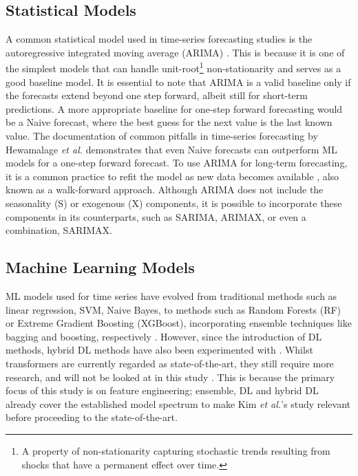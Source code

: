 \documentclass[ %
                    author={Raj Dhakan},
                supervisor={Dr. Ayush Joshi},
                    degree={MSc},
                     title={Ethereum Price Prediction using Internal and External Factors},
                  subtitle={},
                      type={},
                      year={2025}]{dissertation}
\begin{document}
\subsection{Statistical Models}
\label{sec:statistical_models}
A common statistical model used in time-series forecasting studies is the autoregressive integrated moving average (ARIMA) \cite{sailaja2024crypto}. This is because it is one of the simplest models that can handle unit-root\footnote{A property of non-stationarity capturing stochastic trends resulting from shocks that have a permanent effect over time.} non-stationarity and serves as a good baseline model. It is essential to note that ARIMA is a valid baseline only if the forecasts extend beyond one step forward, albeit still for short-term predictions. A more appropriate baseline for one-step forward forecasting would be a Naive forecast, where the best guess for the next value is the last known value. The documentation of common pitfalls in time-series forecasting by Hewamalage \textit{et al.} \cite{hewamalage2023forecast} demonstrates that even Naive forecasts can outperform ML models for a one-step forward forecast. To use ARIMA for long-term forecasting, it is a common practice to refit the model as new data becomes available \cite{hewamalage2023forecast}, also known as a walk-forward approach. Although ARIMA does not include the seasonality (S) or exogenous (X) components, it is possible to incorporate these components in its counterparts, such as SARIMA, ARIMAX, or even a combination, SARIMAX.

\subsection{Machine Learning Models}
ML models used for time series have evolved from traditional methods such as linear regression, SVM, Naive Bayes, to methods such as Random Forests (RF) or Extreme Gradient Boosting (XGBoost), incorporating ensemble techniques like bagging and boosting, respectively \cite{john2024cryptocurrency}. However, since the introduction of DL methods, hybrid DL methods have also been experimented with \cite{john2024cryptocurrency}. Whilst transformers are currently regarded as state-of-the-art, they still require more research, and will not be looked at in this study \cite{john2024cryptocurrency}. This is because the primary focus of this study is on feature engineering; ensemble, DL and hybrid DL already cover the established model spectrum to make Kim \textit{et al.}'s \cite{RN141} study relevant before proceeding to the state-of-the-art. 
\end{document}
